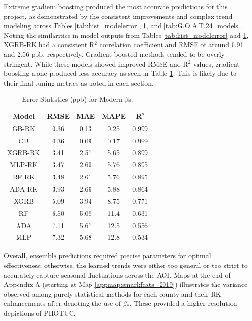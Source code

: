 Extreme gradient boosting produced the most accurate predictions for this project, as demonstrated by the consistent improvements and complex trend modeling across Tables \ref{tab:hist_modelerror}, \ref{tab:modern_modelerror}, and \ref{tab:G.O.A.T.24_models}. Noting the similarities in model outputs from Tables \ref{tab:hist_modelerror} and \ref{tab:modern_modelerror}, XGRB-RK had a consistent R$^{2}$ correlation coefficient and RMSE of around 0.91 and 2.56 ppb, respectively. Gradient-boosted methods tended to be overly stringent. While these models showed improved RMSE and R$^{2}$ values, gradient boosting alone produced less accuracy as seen in Table \ref{tab:modern_modelerror}. This is likely due to their final tuning metrics as noted in each section.
\begin{table}[h!]
    \centering
        \begin{tabular}{||c|cccc||}
            \hline
            \textbf{Model}  & \textbf{RMSE} & \textbf{MAE} & \textbf{MAPE} & \textbf{R$^{2}$} \\
            \hline \hline 
              GB-RK &  0.36 & 0.13 &  0.25 & 0.999 \\[3pt]
                 GB &  0.36 & 0.09 &  0.17 & 0.999 \\[3pt]
             XGRB-RK &  3.41 & 2.57 &  5.65 & 0.899 \\[3pt]
             MLP-RK &  3.47 & 2.60 &  5.76 & 0.895 \\[3pt]
              RF-RK &  3.48 & 2.61 &  5.76 & 0.895 \\[3pt]
             ADA-RK &  3.93 & 2.66 &  5.88 & 0.864 \\[3pt]
               XGRB &  5.09 & 3.94 &  8.75 & 0.771 \\[3pt]
                 RF &  6.50 & 5.08 & 11.4  & 0.631 \\[3pt]
                ADA &  7.11 & 5.67 & 12.5  & 0.556 \\[3pt]
                MLP &  7.32 & 5.68 & 12.8  & 0.534 \\ 
            \hline
        \end{tabular}
    \caption{Error Statistics (ppb) for Modern $\beta$s.} 
    \label{tab:modern_modelerror}
\end{table} Overall, ensemble predictions required precise parameters for optimal effectiveness; otherwise, the learned trends were either too general or too strict to accurately capture seasonal fluctuations across the AOI. Maps at the end of Appendix A (starting at Map \ref{appmap:smarkfeats_2019}) illustrates the variance observed among purely statistical methods for each county and their RK enhancements after denoting the use of $\beta$s. These provided a higher resolution depictions of PHOTUC. 

